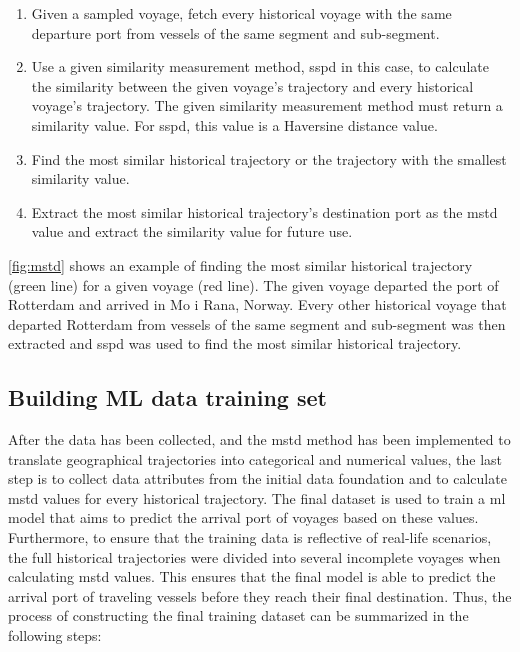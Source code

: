 \begin{enumerate}
    \item Given a sampled voyage, fetch every historical voyage with the same departure port from vessels of the same segment and sub-segment.
    \item Use a given similarity measurement method, \acrshort{sspd} in this case, to calculate the similarity between the given voyage's trajectory and every historical voyage's trajectory. The given similarity measurement method must return a similarity value. For \acrshort{sspd}, this value is a Haversine distance value.
    \item Find the most similar historical trajectory or the trajectory with the smallest similarity value.
    \item Extract the most similar historical trajectory's destination port as the \acrshort{mstd} value and extract the similarity value for future use.
\end{enumerate}

\cref{fig:mstd} shows an example of finding the most similar historical trajectory (green line) for a given voyage (red line). The given voyage departed the port of Rotterdam and arrived in Mo i Rana, Norway. Every other historical voyage that departed Rotterdam from vessels of the same segment and sub-segment was then extracted and \acrshort{sspd} was used to find the most similar historical trajectory.

\subsection{Building ML data training set}

After the data has been collected, and the \acrshort{mstd} method has been implemented to translate geographical trajectories into categorical and numerical values, the last step is to collect data attributes from the initial data foundation and to calculate \acrshort{mstd} values for every historical trajectory. The final dataset is used to train a \acrfull{ml} model that aims to predict the arrival port of voyages based on these values. Furthermore, to ensure that the training data is reflective of real-life scenarios, the full historical trajectories were divided into several incomplete voyages when calculating \acrshort{mstd} values. This ensures that the final model is able to predict the arrival port of traveling vessels before they reach their final destination. Thus, the process of constructing the final training dataset can be summarized in the following steps:

